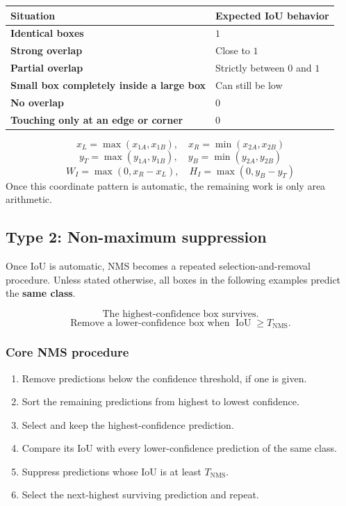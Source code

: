 \documentclass[11pt]{article}
\begin{document}
\begin{center}
\begin{tabularx}{\textwidth}{>{\bfseries}X X}
\toprule
Situation & Expected IoU behavior \\
\midrule
Identical boxes & \(1\) \\
Strong overlap & Close to \(1\) \\
Partial overlap & Strictly between \(0\) and \(1\) \\
Small box completely inside a large box & Can still be low \\
No overlap & \(0\) \\
Touching only at an edge or corner & \(0\) \\
\bottomrule
\end{tabularx}
\end{center}

\begin{focusbox}
\[
\boxed{
x_L=\max(x_{1A},x_{1B}),\quad
x_R=\min(x_{2A},x_{2B})
}
\]
\[
\boxed{
y_T=\max(y_{1A},y_{1B}),\quad
y_B=\min(y_{2A},y_{2B})
}
\]
\[
\boxed{
W_I=\max(0,x_R-x_L),\quad
H_I=\max(0,y_B-y_T)
}
\]
Once this coordinate pattern is automatic, the remaining work is only area arithmetic.
\end{focusbox}

\subsection{Type 2: Non-maximum suppression}

Once IoU is automatic, NMS becomes a repeated selection-and-removal procedure. Unless stated otherwise, all boxes in the following examples predict the \textbf{same class}.

\begin{formulabox}
\[
\boxed{\text{The highest-confidence box survives.}}
\]
\[
\boxed{
\text{Remove a lower-confidence box when }
\operatorname{IoU}\geq T_{\mathrm{NMS}}.
}
\]
\end{formulabox}

\subsubsection{Core NMS procedure}

\begin{enumerate}[label=\textbf{Step \arabic*:},leftmargin=*,align=left]
  \item Remove predictions below the confidence threshold, if one is given.
  \item Sort the remaining predictions from highest to lowest confidence.
  \item Select and keep the highest-confidence prediction.
  \item Compare its IoU with every lower-confidence prediction of the same class.
  \item Suppress predictions whose IoU is at least \(T_{\mathrm{NMS}}\).
  \item Select the next-highest surviving prediction and repeat.
\end{enumerate}
\end{document}
